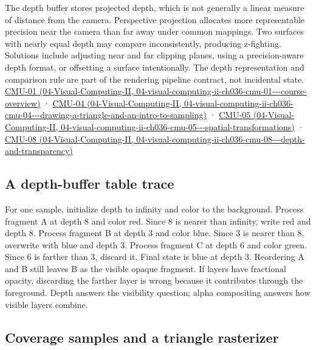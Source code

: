 The depth buffer stores projected depth, which is not generally a linear measure of distance from the camera. Perspective projection allocates more representable precision near the camera than far away under common mappings. Two surfaces with nearly equal depth may compare inconsistently, producing z-fighting. Solutions include adjusting near and far clipping planes, using a precision-aware depth format, or offsetting a surface intentionally. The depth representation and comparison rule are part of the rendering pipeline contract, not incidental state. \href{../04-Visual-Computing-II/main.pdf\#nameddest=04-visual-computing-ii-ch036-cmu-01---course-overview}{CMU-01 (04-Visual-Computing-II, 04-visual-computing-ii-ch036-cmu-01-\/-\/-course-overview)} · \href{../04-Visual-Computing-II/main.pdf\#nameddest=04-visual-computing-ii-ch036-cmu-04---drawing-a-triangle-and-an-intro-to-sampling}{CMU-04 (04-Visual-Computing-II, 04-visual-computing-ii-ch036-cmu-04-\/-\/-drawing-a-triangle-and-an-intro-to-sampling)} · \href{../04-Visual-Computing-II/main.pdf\#nameddest=04-visual-computing-ii-ch036-cmu-05---spatial-transformations}{CMU-05 (04-Visual-Computing-II, 04-visual-computing-ii-ch036-cmu-05-\/-\/-spatial-transformations)} · \href{../04-Visual-Computing-II/main.pdf\#nameddest=04-visual-computing-ii-ch036-cmu-08---depth-and-transparency}{CMU-08 (04-Visual-Computing-II, 04-visual-computing-ii-ch036-cmu-08-\/-\/-depth-and-transparency)}

\subsection{A depth-buffer table trace}\label{03-visual-computing-i-ch015-a-depth-buffer-table-trace}

For one sample, initialize depth to infinity and color to the background. Process fragment A at depth 8 and color red. Since 8 is nearer than infinity, write red and depth 8. Process fragment B at depth 3 and color blue. Since 3 is nearer than 8, overwrite with blue and depth 3. Process fragment C at depth 6 and color green. Since 6 is farther than 3, discard it. Final state is blue at depth 3. Reordering A and B still leaves B as the visible opaque fragment. If layers have fractional opacity, discarding the farther layer is wrong because it contributes through the foreground. Depth answers the visibility question; alpha compositing answers how visible layers combine.

\subsection{Coverage samples and a triangle rasterizer}\label{03-visual-computing-i-ch015-coverage-samples-and-a-triangle-rasterizer}

